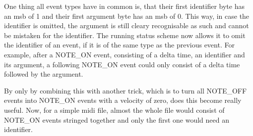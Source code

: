One thing all event types have in common is, that their first identifier byte has an \gls{msb} of 1 and their first argument byte has an \gls{msb} of 0. This way, in case the identifier is omitted, the argument is still cleary recognisable as such and cannot be mistaken for the identifier. The running status scheme now allows it to omit the identifier of an event, if it is of the same type as the previous event. For example, after a NOTE\_ON event, consisting of a delta time, an identifier and its argument, a following NOTE\_ON event could only consist of a delta time followed by the argument.

By only by combining this with another trick, which is to turn all NOTE\_OFF events into NOTE\_ON events with a velocity of zero, does this become really useful. Now, for a simple \gls{midi} file, almost the whole file would consist of NOTE\_ON events stringed together and only the first one would need an identifier.

